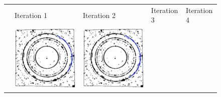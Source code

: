 \documentclass[preprint]{iucr}              %
\begin{document}
\begin{figure}
\centering

\begin{tabular}{>{\centering\arraybackslash}m{.12\linewidth}
>{\centering\arraybackslash}m{.19\linewidth}
>{\centering\arraybackslash}m{.19\linewidth}
>{\centering\arraybackslash}m{.19\linewidth}
>{\centering\arraybackslash}m{.19\linewidth}}    

&Iteration 1 & Iteration 2 & Iteration 3 & Iteration 4
\\
{\color{blue}Region}&
\includegraphics[width=\linewidth]{Detail/o_Si12_0002_R_2_0.png}&
\includegraphics[width=\linewidth]{Detail/o_Si12_0002_R_2_1.png}&

\end{tabular}
\end{figure}
\end{document}

